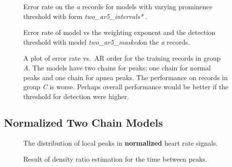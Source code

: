 \documentclass[12pt]{article}
\newcommand{\BestModel}{\emph{two\_ar5\_masked}}
\begin{document}
\begin{figure}
  \centering
    \caption{Error rate on the \emph{a} records for models with
      varying prominence threshold with form
      \emph{two\_ar5\_intervals*} .}
  \label{fig:prominence_study}
\end{figure}

\begin{figure}
  \centering
    \caption{Error rate of model vs the weighting exponent and the
      detection threshold with model \BestModel on the
      \emph{a} records.}
  \label{fig:power_threshold}
\end{figure}

\begin{figure}
  \centering
    \caption{A plot of error rate vs.\ AR order for the training
      records in group \emph{A}.  The models have two chains for
      peaks; one chain for normal peaks and one chain for apnea
      peaks.  The performance on records in group \emph{C} is worse.
      Perhaps overall performance would be better if the threshold for
      detection were higher.}
  \label{fig:errors_vs_ar_order}
\end{figure}

\begin{table*}
  \centering
  
  \caption[Performance]{Performance of pass-1 combined with pass-2 on
    training data with model
    \BestModel\ for pass-2.}
  \label{tab:score_initial}
\end{table*}

\subsection{Normalized Two Chain Models}
\label{sec:norm_two}


\begin{figure}
  \centering
    \caption{The distribution of local peaks in \textbf{normalized}
      heart rate signals.}
  \label{fig:norm_analyze_peaks}
\end{figure}

\begin{figure}
  \centering
    \caption{Result of density ratio estimation for the time between peaks.}
  \label{fig:norm_interval_pdfs}
\end{figure}
\end{document}
